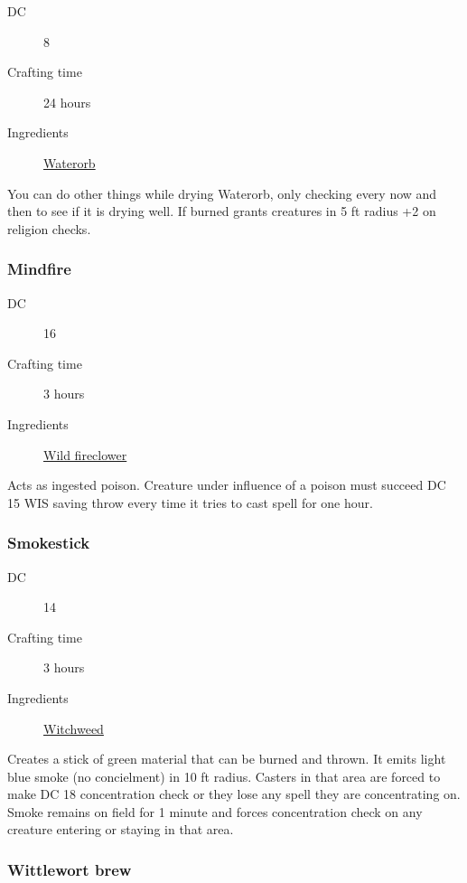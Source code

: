 \begin{description}
\item [DC] 8
\item [Crafting time] 24 hours
\item [Ingredients] \hyperref[Waterorb]{Waterorb}
\end{description}

You can do other things while drying Waterorb, only checking every now and then to see if it is drying well.
 If burned grants creatures in 5 ft radius +2 on religion checks.

\subsubsection{Mindfire}
\label{Mindfire}

\begin{description}
\item [DC] 16
\item [Crafting time] 3 hours
\item [Ingredients] \hyperref[Wild Fireclover]{Wild fireclower}
\end{description}

Acts as ingested poison. Creature under influence of a poison must succeed DC 15 WIS 
saving throw every time it tries to cast spell for one hour.

\subsubsection{Smokestick}
\label{Smokestick}

\begin{description}
\item [DC] 14
\item [Crafting time] 3 hours
\item [Ingredients] \hyperref[Witchweed]{Witchweed}
\end{description}

Creates a stick of green material that can be burned and thrown. It emits light blue smoke 
(no concielment) in 10 ft radius. Casters in that area are forced to make DC 18 concentration check 
or they lose any spell they are concentrating on. 
Smoke remains on field for 1 minute and forces concentration check on any creature entering or staying in that area.

\subsubsection{Wittlewort brew}
\label{Wittlewort brew}


